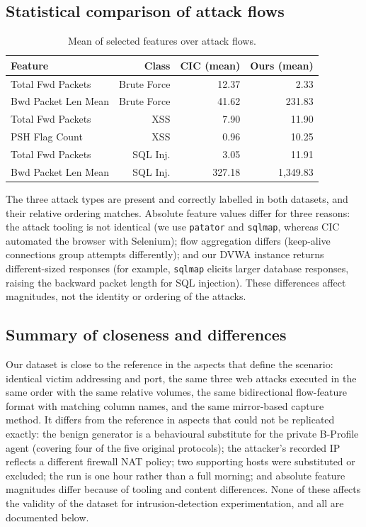 \documentclass[11pt]{article}
\begin{document}
\subsection{Statistical comparison of attack flows}
\begin{table}[h]
\centering
\caption{Mean of selected features over attack flows.}
\label{tab:attackstats}
\begin{tabular}{@{}lrrr@{}}
\toprule
Feature & Class & CIC (mean) & Ours (mean) \\
\midrule
Total Fwd Packets   & Brute Force & 12.37 & 2.33 \\
Bwd Packet Len Mean & Brute Force & 41.62 & 231.83 \\
Total Fwd Packets   & XSS         & 7.90 & 11.90 \\
PSH Flag Count      & XSS         & 0.96 & 10.25 \\
Total Fwd Packets   & SQL Inj.    & 3.05 & 11.91 \\
Bwd Packet Len Mean & SQL Inj.    & 327.18 & 1{,}349.83 \\
\bottomrule
\end{tabular}
\end{table}
The three attack types are present and correctly labelled in both datasets, and
their relative ordering matches. Absolute feature values differ for three
reasons: the attack tooling is not identical (we use \texttt{patator} and
\texttt{sqlmap}, whereas CIC automated the browser with Selenium); flow
aggregation differs (keep-alive connections group attempts differently); and our
DVWA instance returns different-sized responses (for example, \texttt{sqlmap}
elicits larger database responses, raising the backward packet length for SQL
injection). These differences affect magnitudes, not the identity or ordering of
the attacks.

\subsection{Summary of closeness and differences}
Our dataset is close to the reference in the aspects that define the scenario:
identical victim addressing and port, the same three web attacks executed in the
same order with the same relative volumes, the same bidirectional flow-feature
format with matching column names, and the same mirror-based capture method. It
differs from the reference in aspects that could not be replicated exactly: the
benign generator is a behavioural substitute for the private B-Profile agent
(covering four of the five original protocols); the attacker's recorded IP
reflects a different firewall NAT policy; two supporting hosts were substituted
or excluded; the run is one hour rather than a full morning; and absolute feature
magnitudes differ because of tooling and content differences. None of these
affects the validity of the dataset for intrusion-detection experimentation, and
all are documented below.
\end{document}
